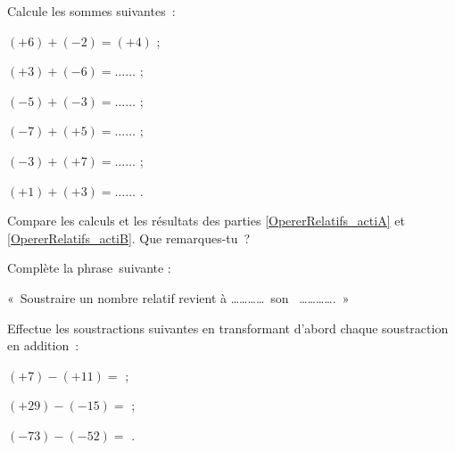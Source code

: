 \begin{activite}
\begin{partie}
Calcule les sommes suivantes : \label{OpererRelatifs_actiB}
\begin{colenumerate}{3}
 \item $(+6) + (-2) = (+4)$ ;
\vspace{.5em}
 \item $(+3) + (-6) = \dots \dots$ ;
 \item $(-5) + (-3) = \dots \dots$ ;
 \item $(-7) + (+5) = \dots \dots$ ;
 \item $(-3) + (+7) = \dots \dots$ ;
 \item $(+1) + (+3) = \dots \dots$ .
 \end{colenumerate}
\end{partie}

\begin{partie}
Compare les calculs et les résultats des parties \ref{OpererRelatifs_actiA} et \ref{OpererRelatifs_actiB}. Que remarques-tu ?

Complète la phrase suivante :

« Soustraire un nombre relatif revient à \ldots \ldots \ldots \ldots ~son~  \ldots \ldots \ldots \ldots . »
\end{partie}

\begin{partie}
Effectue les soustractions suivantes en transformant d'abord chaque soustraction en addition :
\vspace{0.1em}
\begin{colenumerate}{1}
 \item $(+7) - (+11) =$ \dotfill;
\vspace{0.5em}
 \item $(+29) - (-15) =$ \dotfill;
 \vspace{0.5em}
 \item $(-73) - (-52) =$ \dotfill.
 \end{colenumerate}
\end{partie}

\end{activite}


\newpage


